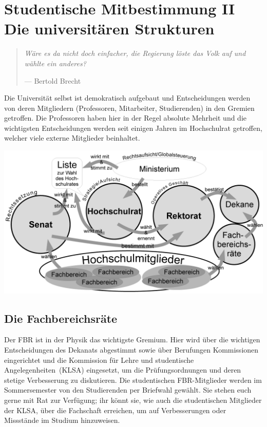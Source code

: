\section*{Studentische Mitbestimmung II\\Die universitären Strukturen}
\begin{multicols*}{2}
\begin{quote}
\textit{Wäre es da nicht doch einfacher, die Regierung löste das Volk auf und wählte ein anderes?}

\hfill--- Bertold Brecht
\end{quote}
Die Universität selbst ist demokratisch aufgebaut und Entscheidungen werden von deren Mitgliedern (Professoren, Mitarbeiter, Studierenden) in den Gremien getroffen. Die Professoren haben hier in der Regel absolute Mehrheit und die wichtigsten Entscheidungen werden seit einigen Jahren im Hochschulrat getroffen, welcher viele externe Mitglieder beinhaltet.

\includegraphics[width=\columnwidth]{res/uni_strukturen.png}
\vspace{-2em}
\subsection*{Die Fachbereichsräte}
Der FBR ist in der Physik das wichtigste Gremium. Hier wird über die wichtigen Entscheidungen des Dekanats abgestimmt sowie über Berufungen Kommissionen eingerichtet und die Kommission für Lehre und studentische Angelegenheiten~(KLSA) eingesetzt, um die Prüfungsordnungen und deren stetige Verbesserung zu diskutieren. Die studentischen FBR-Mitglieder werden im Sommersemester von den Studierenden per Briefwahl gewählt. Sie stehen euch gerne mit Rat zur Verfügung; ihr könnt sie, wie auch die studentischen Mitglieder der KLSA, über die Fachschaft erreichen, um auf Verbesserungen oder Missstände im Studium hinzuweisen.


\end{multicols*}
